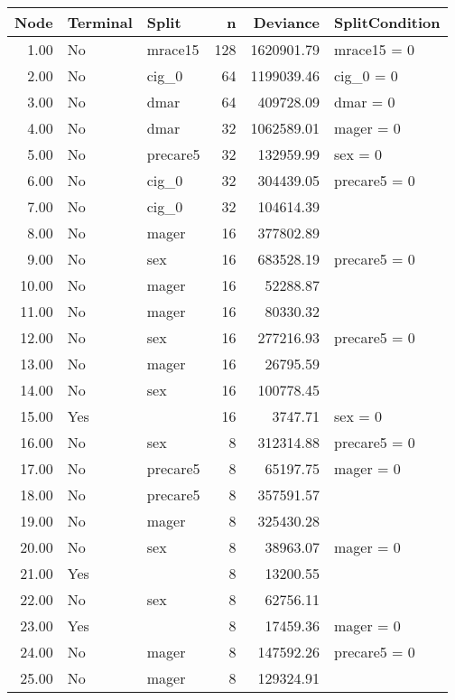 \begin{landscape}
\begin{table}[htbp]
\centering
\begingroup\normalsize
\begin{tabular}{rllrrl}
  \hline
Node & Terminal & Split & n & Deviance & SplitCondition \\ 
  \hline
1.00 & No & mrace15 & 128 & 1620901.79 & mrace15 = 0 \\ 
  2.00 & No & cig_0 &  64 & 1199039.46 & cig_0 = 0 \\ 
  3.00 & No & dmar &  64 & 409728.09 & dmar = 0 \\ 
  4.00 & No & dmar &  32 & 1062589.01 & mager = 0 \\ 
  5.00 & No & precare5 &  32 & 132959.99 & sex = 0 \\ 
  6.00 & No & cig_0 &  32 & 304439.05 & precare5 = 0 \\ 
  7.00 & No & cig_0 &  32 & 104614.39 &  \\ 
  8.00 & No & mager &  16 & 377802.89 &  \\ 
  9.00 & No & sex &  16 & 683528.19 & precare5 = 0 \\ 
  10.00 & No & mager &  16 & 52288.87 &  \\ 
  11.00 & No & mager &  16 & 80330.32 &  \\ 
  12.00 & No & sex &  16 & 277216.93 & precare5 = 0 \\ 
  13.00 & No & mager &  16 & 26795.59 &  \\ 
  14.00 & No & sex &  16 & 100778.45 &  \\ 
  15.00 & Yes &  &  16 & 3747.71 & sex = 0 \\ 
  16.00 & No & sex &   8 & 312314.88 & precare5 = 0 \\ 
  17.00 & No & precare5 &   8 & 65197.75 & mager = 0 \\ 
  18.00 & No & precare5 &   8 & 357591.57 &  \\ 
  19.00 & No & mager &   8 & 325430.28 &  \\ 
  20.00 & No & sex &   8 & 38963.07 & mager = 0 \\ 
  21.00 & Yes &  &   8 & 13200.55 &  \\ 
  22.00 & No & sex &   8 & 62756.11 &  \\ 
  23.00 & Yes &  &   8 & 17459.36 & mager = 0 \\ 
  24.00 & No & mager &   8 & 147592.26 & precare5 = 0 \\ 
  25.00 & No & mager &   8 & 129324.91 &  \\ 

\end{tabular}
\end{table}
\end{landscape}
